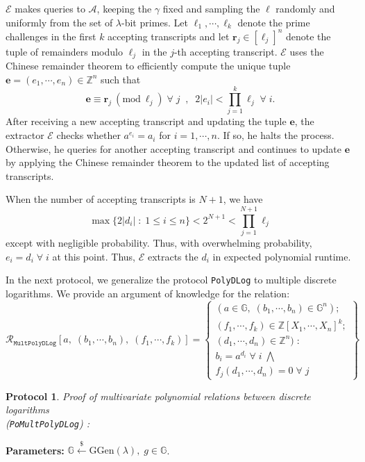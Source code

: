 \documentclass[11pt, lettersize, notitlepage, leqno, footskip=0.6cm]{article}
\newcommand{\bz}{\mathbb Z}
\newcommand{\pl}{\prod\limits}
\newcommand{\ttt}{\texttt}
\newcommand{\mc}{\mathcal}
\newcommand{\mb}{\mathbb}
\newcommand{\mbf}{\mathbf}
\newcommand{\mr}{\mathrm}
\newcommand{\lam}{\lambda}
\newcommand{\lamb}{\lambda}
\newcommand{\A}{\mc{A}}
\newcommand{\vs}{\vspace{-0.15cm}}
\newcommand{\op}{overwhelming probability}
\newcommand{\np}{negligible probability}
\newcommand{\Mod}[1]{\ (\mathrm{mod}\ #1)}
\newcommand{\E}{\mc{E}}
\newtheorem{Prot}[Thm]{Protocol}
\numberwithin{equation}{section}
\begin{document}
\begin{prf}
$\E$ makes queries to $\A$, keeping the $\gamma$ fixed and sampling the $\ell$ randomly and uniformly from the set of $\lam$-bit primes. Let $\ell_1,\cdots,\ell_{k}$ denote the prime challenges in the first $k$ accepting transcripts and let $\mbf{r}_j\in [\ell_j]^n$ denote the tuple of remainders modulo $\ell_j$ in the $j$-th accepting transcript. $\E$ uses the Chinese remainder theorem to efficiently compute the unique tuple $\mbf{e} = (e_1,\cdots,e_n)\in \bz^n$ such that \vs $$\mbf{e}\equiv \mbf{r}_j\Mod{\ell_j}\;\forall\; j\;\;,\;\;2|e_i|< \pl_{j=1}^{k} \ell_j\;\forall\; i.$$ After receiving a new accepting transcript and updating the tuple $\mbf{e}$, the extractor $\E$ checks whether $a^{e_i} = a_i$ for $i=1,\cdots,n$. If so, he halts the process. Otherwise, he queries for another accepting transcript and continues to update $\mbf{e}$ by applying the Chinese remainder theorem to the updated list of accepting transcripts.

When the number of accepting transcripts is $N+1$, we have \vs $$\max\{2|d_i|\;:\;1\leq i\leq n \} < 2^{N+1} < \pl_{j=1}^{N+1}\ell_j$$ except with \np. Thus, with \op, $e_i = d_i\;\forall\;i$ at this point. Thus, $\E$ extracts the $d_i$ in expected polynomial runtime. \end{prf}

In the next protocol, we generalize the protocol \verb|PolyDLog| to multiple discrete logarithms. We provide an argument of knowledge for the relation: 
\[
  \mc{R}_{\ttt{MultPolyDLog}}[a,\; (b_1,\cdots, b_n),\; (f_1,\cdots,f_k)] = \left\{\begin{array}{l}
    (a\in\mb{G},\; (b_1,\cdots, b_n)\in\mb{G}^n);\\
    (f_1,\cdots,f_k)\in\bz[X_1,\cdots,X_n]^k;\\ 
    (d_1,\cdots,d_n)\in\bz^n)\;: \\
    b_i = a^{d_i}\;\forall\; i\;\bigwedge \;\\   f_j(d_1,\cdots,d_n) = 0\;\forall\; j 
  \end{array}\right\}
\] 


\begin{Prot} \normalfont \hypertarget{Mult} {\textit{Proof of multivariate polynomial relations between discrete logarithms}}\\ (\verb|PoMultPolyDLog|) :\end{Prot} \vspace{-0.3cm}

\noindent \textbf{Parameters:} $\mb{G}\xleftarrow{\$} \mr{GGen}(\lamb), \; g\in \mb{G}$.
\end{document}
